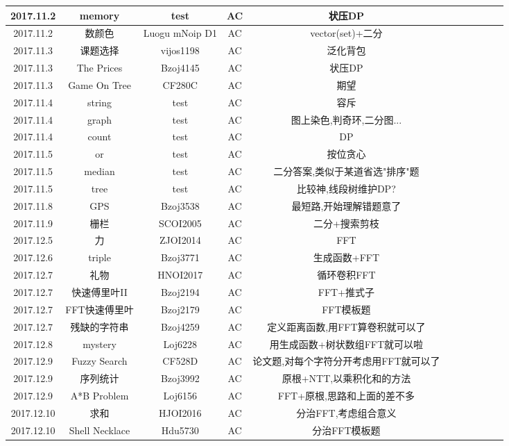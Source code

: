 \documentclass[landscape]{article}
\begin{document}
\begin{longtable}{ccccccccccc}
  \hline
  2017.11.2 & memory & test & AC & 状压DP\\
  \hline
  2017.11.2 & 数颜色 & Luogu mNoip D1 & AC & vector(set)+二分\\
  \hline
  2017.11.3 & 课题选择 & vijos1198 & AC & 泛化背包\\
  \hline
  2017.11.3 & The Prices & Bzoj4145 & AC & 状压DP\\
  \hline
  2017.11.3 & Game On Tree & CF280C & AC & 期望\\
  \hline
  2017.11.4 & string & test & AC & 容斥\\
  \hline
  2017.11.4 & graph & test & AC & 图上染色,判奇环,二分图...\\
  \hline
  2017.11.4 & count & test & AC & DP\\
  \hline
  2017.11.5 & or & test & AC & 按位贪心\\
  \hline
  2017.11.5 & median & test & AC & 二分答案,类似于某道省选"排序"题\\
  \hline
  2017.11.5 & tree & test & AC & 比较神,线段树维护DP?\\
  \hline
  2017.11.8 & GPS & Bzoj3538 & AC & 最短路,开始理解错题意了\\
  \hline
  2017.11.9 & 栅栏 & SCOI2005 & AC & 二分+搜索剪枝\\
  \hline
  2017.12.5 & 力 & ZJOI2014 & AC & FFT\\
  \hline
  2017.12.6 & triple & Bzoj3771 & AC & 生成函数+FFT\\
  \hline
  2017.12.7 & 礼物 & HNOI2017 & AC & 循环卷积FFT\\
  \hline
  2017.12.7 & 快速傅里叶II & Bzoj2194 & AC & FFT+推式子\\
  \hline
  2017.12.7 & FFT快速傅里叶 & Bzoj2179 & AC & FFT模板题\\
  \hline
  2017.12.7 & 残缺的字符串 & Bzoj4259 & AC & 定义距离函数,用FFT算卷积就可以了\\
  \hline
  2017.12.8 & mystery & Loj6228 & AC & 用生成函数+树状数组FFT就可以啦\\
  \hline
  2017.12.9 & Fuzzy Search & CF528D & AC & 论文题,对每个字符分开考虑用FFT就可以了\\
  \hline
  2017.12.9 & 序列统计 & Bzoj3992 & AC & 原根+NTT,以乘积化和的方法\\
  \hline
  2017.12.9 & A*B Problem & Loj6156 & AC & FFT+原根,思路和上面的差不多\\
  \hline
  2017.12.10 & 求和 & HJOI2016 & AC & 分治FFT,考虑组合意义\\
  \hline
  2017.12.10 & Shell Necklace & Hdu5730 & AC & 分治FFT模板题\\

\end{longtable}
\end{document}
